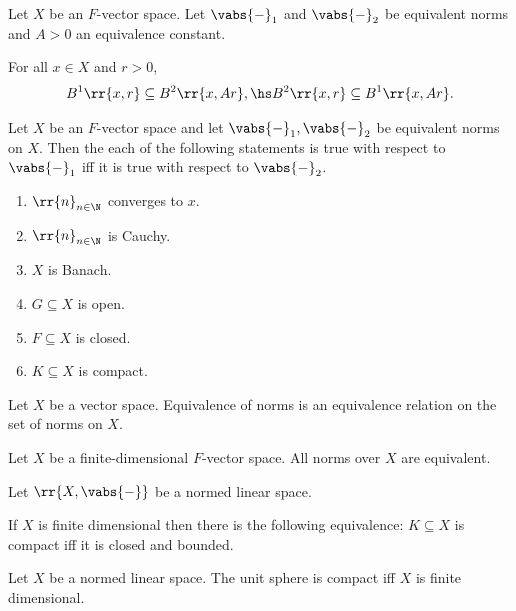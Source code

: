 \documentclass{article}
\begin{document}
\begin{lemma}
	Let $X$ be an $F$-vector space. Let $\vabs{-}_{1}$ and $\vabs{-}_{2}$ be equivalent norms
	and $A>0$ an equivalence constant.

	For all $x\in X$ and $r>0$,
	\begin{align*}
		B^1\rr{x,r}\subseteq B^2\rr{x,Ar}, \hs
		B^2\rr{x,r}\subseteq B^1\rr{x,Ar}.
	\end{align*}
\end{lemma}

\begin{lemma}
	Let $X$ be an $F$-vector space and let $\vabs{-}_{1},\vabs{-}_{2}$ be equivalent norms
	on $X$. Then the each of the following statements is true with respect to $\vabs{-}_{1}$ iff it is true with respect to $\vabs{-}_{2}$.
	\begin{enumerate}
		\item $\rr{n}_{n\in\N}$ converges to $x$.
		\item $\rr{n}_{n\in\N}$ is Cauchy.
		\item $X$ is Banach.
		\item $G\subseteq X$ is open.
		\item $F\subseteq X$ is closed.
		\item $K\subseteq X$ is compact.
	\end{enumerate}
\end{lemma}

\begin{lemma}
	Let $X$ be a vector space. Equivalence of norms is an equivalence relation on the set of
	norms on $X$.
\end{lemma}

\begin{theorem}
	Let $X$ be a finite-dimensional $F$-vector space. All norms over $X$ are equivalent.
\end{theorem}

\begin{theorem}
	Let $\rr{X, \vabs{-}}$ be a normed linear space.

	If $X$ is finite dimensional then there is the following equivalence: $K\subseteq X$
	is compact iff it is closed and bounded.
\end{theorem}

\begin{theorem}
	Let $X$ be a normed linear space. The unit sphere is compact iff $X$ is finite dimensional.
\end{theorem}
\end{document}

